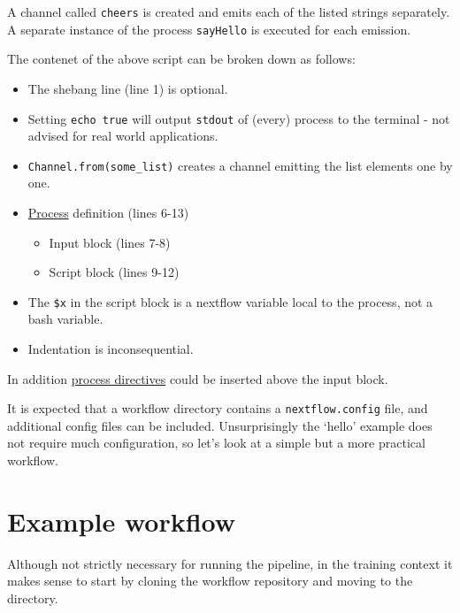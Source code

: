 A channel called \texttt{cheers} is created and emits each of the listed strings separately. 
A separate instance of the process \texttt{sayHello} is executed for each emission. 

\begin{note}
The contenet of the above script can be broken down as follows:
\begin{itemize}
  \item The shebang line (line 1) is optional.
  \item Setting \texttt{echo true} will output \texttt{stdout} of (every) process to the terminal - not advised for real world applications.
  \item \texttt{Channel.from(some\_list)} creates a channel emitting the list elements one by one.
  \item \href{https://www.nextflow.io/docs/latest/process.html}{Process} definition (lines 6-13)
  \begin{itemize}
    \item Input block (lines 7-8)
    \item Script block (lines 9-12)
  \end{itemize}
  \item The \texttt{\$x} in the script block is a nextflow variable local to the process, not a bash variable.
  \item Indentation is inconsequential. 
\end{itemize}
In addition \href{https://www.nextflow.io/docs/latest/process.html#directives}{process directives} could be inserted above the input block.
\end{note}


\begin{information}
It is expected that a workflow directory contains a \texttt{nextflow.config} file, and additional config files can be included. Unsurprisingly the `hello' example does not require much configuration, so let's look at a simple but a more practical workflow.
\end{information}

\newpage

\section{Example workflow}

Although not strictly necessary for running the pipeline, in the training context it makes sense to start by cloning the workflow repository and moving to the directory.


